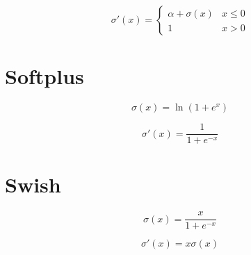 \documentclass{article}
\begin{document}
\begin{equation}
  \sigma'(x) =
    \begin{cases}
      \alpha + \sigma(x) & x \leq 0\\
      1 & x > 0
    \end{cases}
\end{equation}

\section{Softplus}

\begin{equation}
  \sigma(x) = \ln(1 + e^x)
\end{equation}

\begin{equation}
  \sigma'(x) = \frac{1}{1 + e^{-x}}
\end{equation}

\section{Swish}

\begin{equation}
\sigma(x) = \frac{x}{1 + e^{-x}}
\end{equation}

\begin{equation}
\sigma'(x) = x\sigma(x)
\end{equation}
\end{document}
